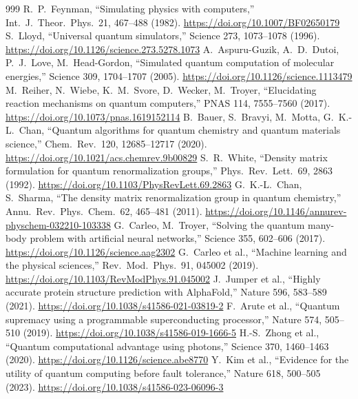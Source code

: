 \documentclass[10pt,a4paper]{article}
\begin{document}
\begin{thebibliography}{999}\small
\setlength{\itemsep}{1pt}
 R.~P.~Feynman, ``Simulating physics with computers,'' Int.\ J.\ Theor.\ Phys.\ 21, 467--488 (1982). \url{https://doi.org/10.1007/BF02650179}
 S.~Lloyd, ``Universal quantum simulators,'' Science 273, 1073--1078 (1996). \url{https://doi.org/10.1126/science.273.5278.1073}
 A.~Aspuru-Guzik, A.~D.~Dutoi, P.~J.~Love, M.~Head-Gordon, ``Simulated quantum computation of molecular energies,'' Science 309, 1704--1707 (2005). \url{https://doi.org/10.1126/science.1113479}
 M.~Reiher, N.~Wiebe, K.~M.~Svore, D.~Wecker, M.~Troyer, ``Elucidating reaction mechanisms on quantum computers,'' PNAS 114, 7555--7560 (2017). \url{https://doi.org/10.1073/pnas.1619152114}
 B.~Bauer, S.~Bravyi, M.~Motta, G.~K.-L.~Chan, ``Quantum algorithms for quantum chemistry and quantum materials science,'' Chem.\ Rev.\ 120, 12685--12717 (2020). \url{https://doi.org/10.1021/acs.chemrev.9b00829}
 S.~R.~White, ``Density matrix formulation for quantum renormalization groups,'' Phys.\ Rev.\ Lett.\ 69, 2863 (1992). \url{https://doi.org/10.1103/PhysRevLett.69.2863}
 G.~K.-L.~Chan, S.~Sharma, ``The density matrix renormalization group in quantum chemistry,'' Annu.\ Rev.\ Phys.\ Chem.\ 62, 465--481 (2011). \url{https://doi.org/10.1146/annurev-physchem-032210-103338}
 G.~Carleo, M.~Troyer, ``Solving the quantum many-body problem with artificial neural networks,'' Science 355, 602--606 (2017). \url{https://doi.org/10.1126/science.aag2302}
 G.~Carleo et al., ``Machine learning and the physical sciences,'' Rev.\ Mod.\ Phys.\ 91, 045002 (2019). \url{https://doi.org/10.1103/RevModPhys.91.045002}
 J.~Jumper et al., ``Highly accurate protein structure prediction with AlphaFold,'' Nature 596, 583--589 (2021). \url{https://doi.org/10.1038/s41586-021-03819-2}
 F.~Arute et al., ``Quantum supremacy using a programmable superconducting processor,'' Nature 574, 505--510 (2019). \url{https://doi.org/10.1038/s41586-019-1666-5}
 H.-S.~Zhong et al., ``Quantum computational advantage using photons,'' Science 370, 1460--1463 (2020). \url{https://doi.org/10.1126/science.abe8770}
 Y.~Kim et al., ``Evidence for the utility of quantum computing before fault tolerance,'' Nature 618, 500--505 (2023). \url{https://doi.org/10.1038/s41586-023-06096-3}

\end{thebibliography}
\end{document}
